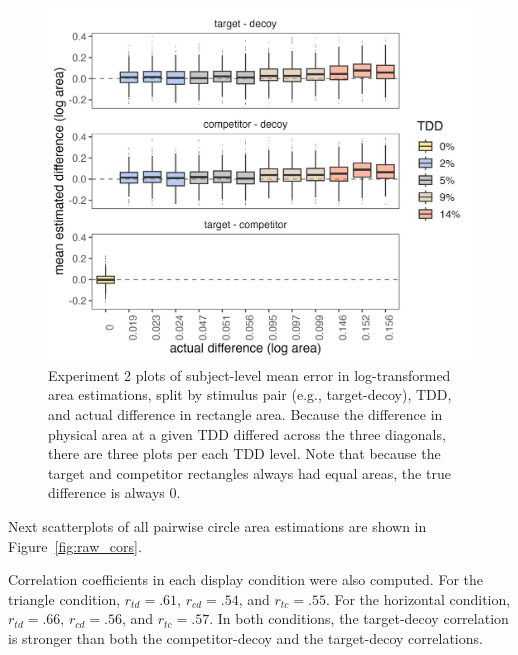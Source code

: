 \begin{figure}
   \includegraphics[width=\textwidth]{figures/circleAreaPhase_boxplot_meanlogdiffs_no_outliers.jpeg}
   \caption{Experiment 2 plots of subject-level mean error in log-transformed area estimations, split by stimulus pair (e.g., target-decoy), TDD, and actual difference in rectangle area. Because the difference in physical area at a given TDD differed across the three diagonals, there are three plots per each TDD level. Note that because the target and competitor rectangles always had equal areas, the true difference is always 0.}
   \label{fig:circle_boxplots}
\end{figure}

Next scatterplots of all pairwise circle area estimations are shown in Figure~\ref{fig:raw_cors}. 

Correlation coefficients in each display condition were also computed. For the triangle condition, $r_{td}=.61$, $r_{cd}=.54$, and $r_{tc}=.55$. For the horizontal condition, $r_{td}=.66$, $r_{cd}=.56$, and $r_{tc}=.57$. In both conditions, the target-decoy correlation is stronger than both the competitor-decoy and the target-decoy correlations. 

